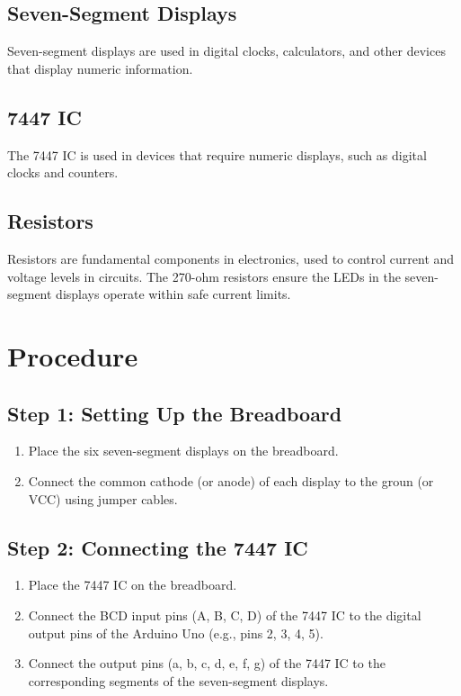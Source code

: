 \documentclass[journal]{IEEEtran}
\begin{document}
\subsection{Seven-Segment Displays}
Seven-segment displays are used in digital clocks, calculators, and other devices that display numeric information.

\subsection{7447 IC}
The 7447 IC is used in devices that require numeric displays, such as digital clocks and counters.

\subsection{Resistors}
Resistors are fundamental components in electronics, used to control current and voltage levels in circuits. The 270-ohm resistors ensure the LEDs in the seven-segment displays operate within safe current limits.

\section{Procedure}
\subsection{Step 1: Setting Up the Breadboard}
\begin{enumerate}
    \item Place the six seven-segment displays on the breadboard.
    \item Connect the common cathode (or anode) of each display to the groun (or VCC) using jumper cables.
\end{enumerate}

\subsection{Step 2: Connecting the 7447 IC}
\begin{enumerate}
    \item Place the 7447 IC on the breadboard.
    \item Connect the BCD input pins (A, B, C, D) of the 7447 IC to the digital output pins of the Arduino Uno (e.g., pins 2, 3, 4, 5).
    \item Connect the output pins (a, b, c, d, e, f, g) of the 7447 IC to the corresponding segments of the seven-segment displays.
\end{enumerate}
\end{document}
